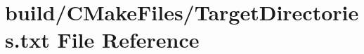 \hypertarget{TargetDirectories_8txt}{}\section{build/\+C\+Make\+Files/\+Target\+Directories.txt File Reference}
\label{TargetDirectories_8txt}
